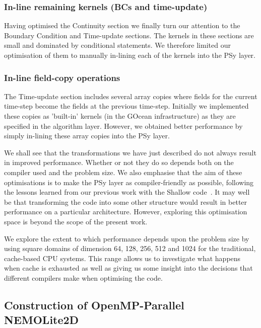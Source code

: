 \documentclass[gmdd, manuscript]{copernicus}
\begin{document}
\subsubsection{In-line remaining kernels (BCs and time-update)}
\label{sec_inline_all_kernels}

Having optimised the Continuity section we finally turn our attention
to the Boundary Condition and Time-update sections. The kernels in
these sections are small and dominated by conditional statements.  We
therefore limited our optimisation of them to manually in-lining each
of the kernels into the PSy layer.

\subsubsection{In-line field-copy operations}
\label{sec_inline_fldcopy}

The Time-update section includes several array copies where fields for
the current time-step become the fields at the previous time-step.
Initially we implemented these copies as 'built-in' kernels (in the
GOcean infrastructure) as they are specified in the algorithm
layer. However, we obtained better performance by simply in-lining
these array copies into the PSy layer.

We shall see that the transformations we have just described do not
always result in improved performance. Whether or not they do so
depends both on the compiler used and the problem size. We also
emphasise that the aim of these optimisations is to make the PSy layer
as compiler-friendly as possible, following the lessons learned from
our previous work with the Shallow code~\citep{shallow_psykal}. It may
well be that transforming the code into some other structure would
result in better performance on a particular architecture. However,
exploring this optimisation space is beyond the scope of the present
work.

We explore the extent to which performance depends upon the problem
size by using square domains of dimension 64, 128, 256, 512 and 1024
for the traditional, cache-based CPU systems. This range allows us to
investigate what happens when cache is exhausted as well as giving us
some insight into the decisions that different compilers make when
optimising the code.

\subsection{Construction of OpenMP-Parallel NEMOLite2D}
\label{sec_omp_steps}
\end{document}
